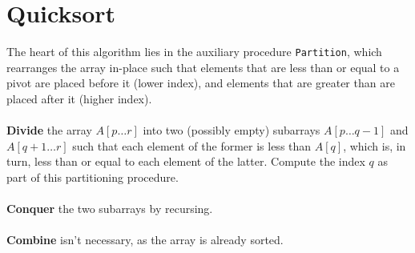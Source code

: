 \section{Quicksort}
The heart of this algorithm lies in the auxiliary procedure \texttt{Partition},
which rearranges the array in-place such that elements that are less than or
equal to a pivot are placed before it (lower index), and elements that are
greater than are placed after it (higher index).
\\\\
\noindent \textbf{Divide} the array $A[p \dots r]$ into two (possibly empty)
subarrays $A[p \dots q-1]$ and $A[q+1 \dots r]$ such that each element of the
former is less than $A[q]$, which is, in turn, less than or equal to each
element of the latter. Compute the index $q$ as part of this partitioning
procedure.
\\\\
\noindent \textbf{Conquer} the two subarrays by recursing.
\\\\
\noindent \textbf{Combine} isn't necessary, as the array is already sorted.

